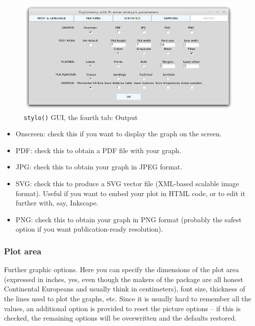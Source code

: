\documentclass[11pt,a4paper]{article}
\def\margin#1{\marginpar{\textcolor{blue}{\footnotesize\tt #1}}}
\def\code#1{{\tt #1}}
\begin{document}
\begin{figure}
  \centering
  \includegraphics[width=0.8\linewidth]{img/stylo-gui_tab5.png}
  \caption{\code{stylo()} GUI, the fourth tab: Output}
\end{figure}


\begin{itemize}
\item Onscreen: check this if you want to display the graph on the screen.\margin{display.on.screen=}\margin{TRUE|FALSE} 

\item PDF: check this to obtain a PDF file with your graph.\margin{write.pdf.file=}\margin{TRUE|FALSE} 

\item JPG: check this to obtain your graph in JPEG format.\margin{write.jpg.file=}\margin{TRUE|FALSE} 

\item SVG: check this to produce a SVG vector file (XML-based scalable image
format). Useful if you want to embed your plot in HTML code, or to
edit it further with, say, Inkscape.\margin{write.svg.file=}\margin{TRUE|FALSE} 

\item PNG: check this to obtain your graph in PNG format (probably the safest
option if you want publication-ready resolution).\margin{write.png.file=}\margin{TRUE|FALSE} 
\end{itemize}

\subsubsection{Plot area}

Further graphic options. Here you can specify the dimensions of the
plot area (expressed in inches, yes, even though the makers of the
package are all honest Continental Europeans and usually think in
centimeters), font size, thickness of the lines used to plot the graphs,
etc. Since it is usually hard to remember all the values, an additional
option is provided to reset the picture options -- if this is checked,
the remaining options will be overwritten and the defaults restored.
\end{document}
